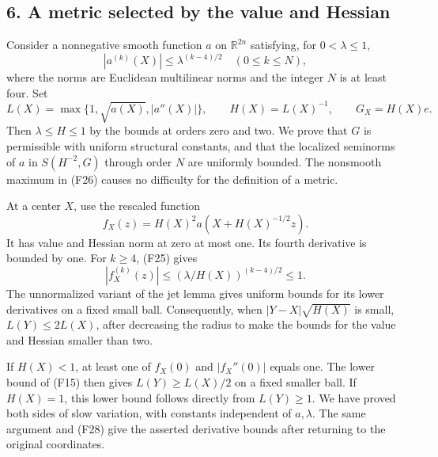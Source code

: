 \documentclass[
  11pt,
]{article}
\makeatletter
\let\ReaderOriginalAnchorStart\hyper@anchorstart
\let\ReaderOriginalAnchorEnd\hyper@anchorend
\let\ReaderPendingAliases\@empty
\def\ReaderArmAliases#1{\gdef\ReaderPendingAliases{#1}}
\def\hyper@anchorstart#1{\ReaderIfNativeAnchorTF{#1}{\ReaderPendingAliases\global\let\ReaderPendingAliases\@empty}{}\ReaderOriginalAnchorStart{#1}}
\makeatother
\begin{document}
\ReaderArmAliases{\ReaderOriginalAnchorStart{AN03-SFP-006}\ReaderOriginalAnchorEnd\begingroup\expandafter\def\csname @currentHref\endcsname{AN03-SFP-006}\label{AN03-SFP-006}\endgroup\ReaderOriginalAnchorStart{an03-sfp-006-a-metric-selected-by-the-value-and-hessian}\ReaderOriginalAnchorEnd\begingroup\expandafter\def\csname @currentHref\endcsname{an03-sfp-006-a-metric-selected-by-the-value-and-hessian}\label{an03-sfp-006-a-metric-selected-by-the-value-and-hessian}\endgroup\ReaderOriginalAnchorStart{6-a-metric-selected-by-the-value-and-hessian}\ReaderOriginalAnchorEnd\begingroup\expandafter\def\csname @currentHref\endcsname{6-a-metric-selected-by-the-value-and-hessian}\label{6-a-metric-selected-by-the-value-and-hessian}\endgroup\ReaderOriginalAnchorStart{a-metric-selected-by-the-value-and-hessian}\ReaderOriginalAnchorEnd}
\subsection{6. A metric selected by the value and
Hessian}\label{a-metric-selected-by-the-value-and-hessian}

Consider a nonnegative smooth function \(a\) on \(\mathbb R^{2n}\)
satisfying, for \(0<\lambda\leq1\), \[
|a^{(k)}(X)|\leq\lambda^{(k-4)/2}
\quad(0\leq k\leq N),
\tag{F25}
\] where the norms are Euclidean multilinear norms and the integer \(N\)
is at least four. Set \[
L(X)=\max\{1,\sqrt{a(X)},|a''(X)|\},\qquad
H(X)=L(X)^{-1},\qquad G_X=H(X)e.
\tag{F26}
\] Then \(\lambda\leq H\leq1\) by the bounds at orders zero and two. We
prove that \(G\) is permissible with uniform structural constants, and
that the localized seminorms of \(a\) in \(S(H^{-2},G)\) through order
\(N\) are uniformly bounded. The nonsmooth maximum in (F26) causes no
difficulty for the definition of a metric.

At a center \(X\), use the rescaled function \[
f_X(z)=H(X)^2 a(X+H(X)^{-1/2}z).
\tag{F27}
\] It has value and Hessian norm at zero at most one. Its fourth
derivative is bounded by one. For \(k\geq4\), (F25) gives \[
|f_X^{(k)}(z)|\leq
 (\lambda/H(X))^{(k-4)/2}\leq1.
\tag{F28}
\] The unnormalized variant of the jet lemma gives uniform bounds for
its lower derivatives on a fixed small ball. Consequently, when
\(|Y-X|\sqrt{H(X)}\) is small, \(L(Y)\leq2L(X)\), after decreasing the
radius to make the bounds for the value and Hessian smaller than two.

If \(H(X)<1\), at least one of \(f_X(0)\) and \(|f_X''(0)|\) equals one.
The lower bound of (F15) then gives \(L(Y)\geq L(X)/2\) on a fixed
smaller ball. If \(H(X)=1\), this lower bound follows directly from
\(L(Y)\geq1\). We have proved both sides of slow variation, with
constants independent of \(a,\lambda\). The same argument and (F28) give
the asserted derivative bounds after returning to the original
coordinates.
\end{document}
